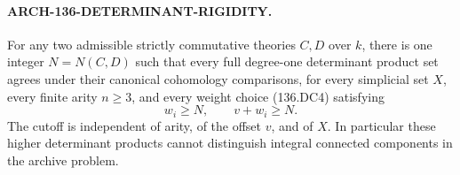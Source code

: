 \paragraph{ARCH-136-DETERMINANT-RIGIDITY.}
For any two admissible strictly commutative theories \(C,D\) over \(k\),
there is one integer \(N=N(C,D)\) such that every full degree-one
determinant product set agrees under their canonical cohomology
comparisons, for every simplicial set \(X\), every finite arity \(n\geq3\),
and every weight choice (136.DC4) satisfying
\[
                        w_i\geq N,\qquad v+w_i\geq N .
                                                               \tag{136.DC7}
\]
The cutoff is independent of arity, of the offset \(v\), and of \(X\).
In particular these higher determinant products cannot distinguish
integral connected components in the archive problem.

